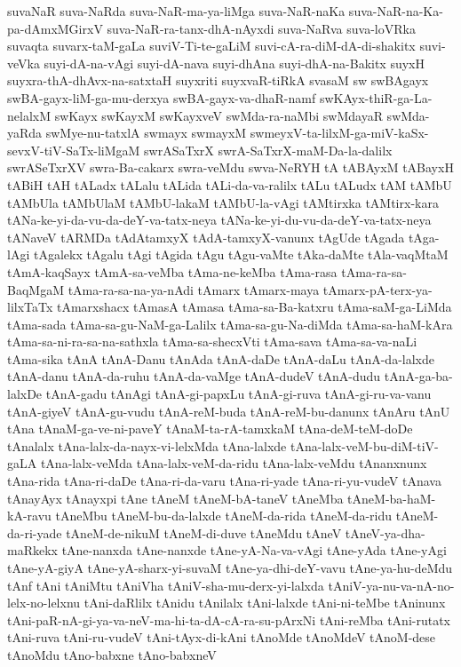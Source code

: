 {suvaNaR
suva-NaRda
suva-NaR-ma-ya-liMga
suva-NaR-naKa
suva-NaR-na-Ka-pa-dAmxMGirxV
suva-NaR-ra-tanx-dhA-nAyxdi
suva-NaRva
suva-loVRka
suvaqta
suvarx-taM-gaLa
suviV-Ti-te-gaLiM
suvi-cA-ra-diM-dA-di-shakitx
suvi-veVka
suyi-dA-na-vAgi
suyi-dA-nava
suyi-dhAna
suyi-dhA-na-Bakitx
suyxH
suyxra-thA-dhAvx-na-satxtaH
suyxriti
suyxvaR-tiRkA
svasaM
sw
swBAgayx
swBA-gayx-liM-ga-mu-derxya
swBA-gayx-va-dhaR-namf
swKAyx-thiR-ga-La-nelalxM
swKayx
swKayxM
swKayxveV
swMda-ra-naMbi
swMdayaR
swMda-yaRda
swMye-nu-tatxlA
swmayx
swmayxM
swmeyxV-ta-lilxM-ga-miV-kaSx-sevxV-tiV-SaTx-liMgaM
swrASaTxrX
swrA-SaTxrX-maM-Da-la-dalilx
swrASeTxrXV
swra-Ba-cakarx
swra-veMdu
swva-NeRYH
tA
tABAyxM
tABayxH
tABiH
tAH
tALadx
tALalu
tALida
tALi-da-va-ralilx
tALu
tALudx
tAM
tAMbU
tAMbUla
tAMbUlaM
tAMbU-lakaM
tAMbU-la-vAgi
tAMtirxka
tAMtirx-kara
tANa-ke-yi-da-vu-da-deY-va-tatx-neya
tANa-ke-yi-du-vu-da-deY-va-tatx-neya
tANaveV
tARMDa
tAdAtamxyX
tAdA-tamxyX-vanunx
tAgUde
tAgada
tAga-lAgi
tAgalekx
tAgalu
tAgi
tAgida
tAgu
tAgu-vaMte
tAka-daMte
tAla-vaqMtaM
tAmA-kaqSayx
tAmA-sa-veMba
tAma-ne-keMba
tAma-rasa
tAma-ra-sa-BaqMgaM
tAma-ra-sa-na-ya-nAdi
tAmarx
tAmarx-maya
tAmarx-pA-terx-ya-lilxTaTx
tAmarxshacx
tAmasA
tAmasa
tAma-sa-Ba-katxru
tAma-saM-ga-LiMda
tAma-sada
tAma-sa-gu-NaM-ga-Lalilx
tAma-sa-gu-Na-diMda
tAma-sa-haM-kAra
tAma-sa-ni-ra-sa-na-sathxla
tAma-sa-shecxVti
tAma-sava
tAma-sa-va-naLi
tAma-sika
tAnA
tAnA-Danu
tAnAda
tAnA-daDe
tAnA-daLu
tAnA-da-lalxde
tAnA-danu
tAnA-da-ruhu
tAnA-da-vaMge
tAnA-dudeV
tAnA-dudu
tAnA-ga-ba-lalxDe
tAnA-gadu
tAnAgi
tAnA-gi-papxLu
tAnA-gi-ruva
tAnA-gi-ru-va-vanu
tAnA-giyeV
tAnA-gu-vudu
tAnA-reM-buda
tAnA-reM-bu-danunx
tAnAru
tAnU
tAna
tAnaM-ga-ve-ni-paveY
tAnaM-ta-rA-tamxkaM
tAna-deM-teM-doDe
tAnalalx
tAna-lalx-da-nayx-vi-lelxMda
tAna-lalxde
tAna-lalx-veM-bu-diM-tiV-gaLA
tAna-lalx-veMda
tAna-lalx-veM-da-ridu
tAna-lalx-veMdu
tAnanxnunx
tAna-rida
tAna-ri-daDe
tAna-ri-da-varu
tAna-ri-yade
tAna-ri-yu-vudeV
tAnava
tAnayAyx
tAnayxpi
tAne
tAneM
tAneM-bA-taneV
tAneMba
tAneM-ba-haM-kA-ravu
tAneMbu
tAneM-bu-da-lalxde
tAneM-da-rida
tAneM-da-ridu
tAneM-da-ri-yade
tAneM-de-nikuM
tAneM-di-duve
tAneMdu
tAneV
tAneV-ya-dha-maRkekx
tAne-nanxda
tAne-nanxde
tAne-yA-Na-va-vAgi
tAne-yAda
tAne-yAgi
tAne-yA-giyA
tAne-yA-sharx-yi-suvaM
tAne-ya-dhi-deY-vavu
tAne-ya-hu-deMdu
tAnf
tAni
tAniMtu
tAniVha
tAniV-sha-mu-derx-yi-lalxda
tAniV-ya-nu-va-nA-no-lelx-no-lelxnu
tAni-daRlilx
tAnidu
tAnilalx
tAni-lalxde
tAni-ni-teMbe
tAninunx
tAni-paR-nA-gi-ya-va-neV-ma-hi-ta-dA-cA-ra-su-pArxNi
tAni-reMba
tAni-rutatx
tAni-ruva
tAni-ru-vudeV
tAni-tAyx-di-kAni
tAnoMde
tAnoMdeV
tAnoM-dese
tAnoMdu
tAno-babxne
tAno-babxneV
}
